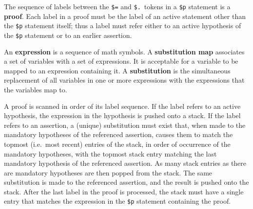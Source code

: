 The sequence of labels between the \texttt{\$=} and \texttt{\$.}\ tokens
in a \texttt{\$p} statement is a {\bf proof}. Each
label in a proof must be the label of an active statement other than the
\texttt{\$p} statement itself; thus a label must refer either to an
active hypothesis of the \texttt{\$p} statement or to an earlier
assertion.

An {\bf expression} is a sequence of math symbols. A {\bf
substitution map} associates a set of variables with a
set of expressions.  It is acceptable for a variable to be mapped to an
expression containing it.  A {\bf
substitution} is the
simultaneous replacement of all variables in one or more expressions with the
expressions that the variables map to.

A proof is scanned in order of its label sequence.  If the label refers to an
active hypothesis, the expression in the hypothesis is pushed onto a
stack.  If the label refers to an assertion, a
(unique) substitution must exist that, when made to the mandatory hypotheses
of the referenced assertion, causes them to match the topmost (i.e.\ most
recent) entries of the stack, in order of occurrence of the mandatory
hypotheses, with the topmost stack entry matching the last mandatory
hypothesis of the referenced assertion.  As many stack entries as there are
mandatory hypotheses are then popped from the stack.  The same substitution is
made to the referenced assertion, and the result is pushed onto the stack.
After the last label in the proof is processed, the stack must have a single
entry that matches the expression in the \texttt{\$p} statement containing the
proof.

